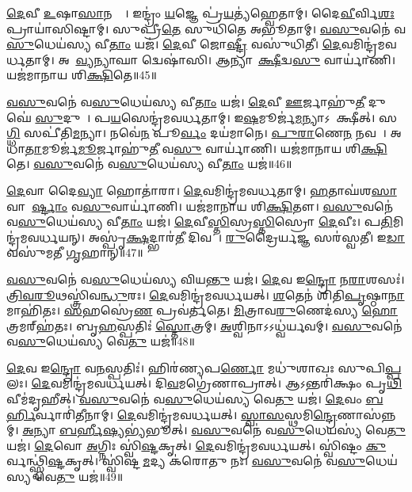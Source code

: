 \ul{𑌦𑍇}𑌵𑍀 \ul{𑌉}𑌷𑌾\ul{𑌸𑌾}𑌨𑌕𑍍𑌤𑌾᳚।
𑌇𑌨𑍍𑌦𑍍𑌰𑌂॑ \ul{𑌯}𑌜𑍍𑌞𑍇 𑌪𑍍𑌰॑\ul{𑌯}𑌤𑍍𑌯॑𑌹𑍍𑌵𑍇𑌤𑌾𑌮𑍍।
𑌦𑍈\ul{𑌵𑍀}𑌰𑍍𑌵𑌿\ul{𑌶𑌃} 𑌪𑍍𑌰𑌾𑌯𑌾॑𑌸𑌿𑌷𑍍𑌟𑌾𑌮𑍍।
𑌸𑍁𑌪𑍍𑌰𑍀॑\ul{𑌤𑍇} 𑌸𑍁𑌧𑌿॑𑌤𑍇 𑌅𑌭𑍂𑌤𑌾𑌮𑍍।
\ul{𑌵}\ul{𑌸𑍁}𑌵𑌨𑍇॑ 𑌵\ul{𑌸𑍁}𑌧𑍇𑌯॑𑌸𑍍𑌯 𑌵𑍀\ul{𑌤𑌾𑌂} 𑌯𑌜॑।
\ul{𑌦𑍇}𑌵𑍀 𑌜𑍋\ul{𑌷𑍍𑌟𑍍𑌰𑍀} 𑌵𑌸𑍁॑𑌧𑌿𑌤𑍀।
\ul{𑌦𑍇}𑌵𑌮𑌿𑌨𑍍𑌦𑍍𑌰॑𑌮𑌵𑌰𑍍𑌧𑌤𑌾𑌮𑍍।
𑌅𑌯𑌾᳚\ul{𑌵𑍍𑌯}𑌨𑍍𑌯𑌾𑌘𑌾 𑌦𑍍𑌵𑍇𑌷𑌾॑𑌸𑌿।
𑌆𑌨𑍍𑌯𑌾𑌵𑌾᳚\ul{𑌕𑍍𑌷𑍀}𑌦𑍍𑌵\ul{𑌸𑍁} 𑌵𑌾𑌰𑍍𑌯𑌾॑𑌣𑌿।
𑌯𑌜॑𑌮𑌾𑌨𑌾𑌯 𑌶𑌿\ul{𑌕𑍍𑌷𑌿}𑌤𑍇॥45॥

\ul{𑌵}\ul{𑌸𑍁}𑌵𑌨𑍇॑ 𑌵\ul{𑌸𑍁}𑌧𑍇𑌯॑𑌸𑍍𑌯 𑌵𑍀\ul{𑌤𑌾𑌂} 𑌯𑌜॑।
\ul{𑌦𑍇}𑌵𑍀 \ul{𑌊}𑌰𑍍𑌜𑌾𑌹𑍁॑\ul{𑌤𑍀} 𑌦𑍁𑌘𑍇॑ \ul{𑌸𑍁}𑌦𑍁𑌘𑍇᳚।
𑌪\ul{𑌯}𑌸𑍇𑌨𑍍𑌦𑍍𑌰॑𑌮𑌵𑌰𑍍𑌧𑌤𑌾𑌮𑍍।
𑌇\ul{𑌷}𑌮𑍂𑌰𑍍𑌜॑\ul{𑌮}𑌨𑍍𑌯𑌾\-𑌽𑌵𑌾᳚𑌕𑍍𑌷𑍀𑌤𑍍।
𑌸\ul{𑌗𑍍𑌧𑌿}\ul{} 𑌸𑌪𑍀॑𑌤𑌿\ul{𑌮}𑌨𑍍𑌯𑌾।
𑌨𑌵𑍇॑\ul{𑌨} 𑌪𑍂\ul{𑌰𑍍𑌵𑌂} 𑌦𑌯॑𑌮𑌾𑌨𑍇।
\ul{𑌪𑍁}\ul{𑌰𑌾}𑌣𑍇\ul{𑌨} 𑌨𑌵𑌮𑍍᳚।
𑌅𑌧𑌾॑\ul{𑌤𑌾}𑌮𑍂𑌰𑍍𑌜॑\ul{𑌮𑍂}𑌰𑍍𑌜𑌾𑌹𑍁॑\ul{𑌤𑍀} 𑌵\ul{𑌸𑍁} 𑌵𑌾𑌰𑍍𑌯𑌾॑𑌣𑌿।
𑌯𑌜॑𑌮𑌾𑌨𑌾𑌯 𑌶𑌿\ul{𑌕𑍍𑌷𑌿}𑌤𑍇।
\ul{𑌵}\ul{𑌸𑍁}𑌵𑌨𑍇॑ 𑌵\ul{𑌸𑍁}𑌧𑍇𑌯॑𑌸𑍍𑌯 𑌵𑍀\ul{𑌤𑌾𑌂} 𑌯𑌜॑॥46॥

\ul{𑌦𑍇}𑌵𑌾 𑌦𑍈\ul{𑌵𑍍𑌯𑌾} 𑌹𑍋𑌤𑌾॑𑌰𑌾।
\ul{𑌦𑍇}𑌵𑌮𑌿𑌨𑍍𑌦𑍍𑌰॑𑌮𑌵𑌰𑍍𑌧𑌤𑌾𑌮𑍍।
\ul{𑌹}𑌤𑌾𑌘॑𑌶\ul{𑌸𑌾}𑌵𑌾\-𑌭𑌾᳚\ul{𑌰𑍍𑌷𑍍𑌟𑌾𑌂} 𑌵\ul{𑌸𑍁}𑌵𑌾𑌰𑍍𑌯𑌾॑𑌣𑌿।
𑌯𑌜॑𑌮𑌾𑌨𑌾𑌯 𑌶𑌿\ul{𑌕𑍍𑌷𑌿}𑌤𑍗।
\ul{𑌵}\ul{𑌸𑍁}𑌵𑌨𑍇॑ 𑌵\ul{𑌸𑍁}𑌧𑍇𑌯॑𑌸𑍍𑌯 𑌵𑍀\ul{𑌤𑌾𑌂} 𑌯𑌜॑।
\ul{𑌦𑍇}𑌵𑍀\ul{𑌸𑍍𑌤𑌿}𑌸𑍍𑌰\ul{𑌸𑍍𑌤𑌿}𑌸𑍍𑌰𑍋 \ul{𑌦𑍇}𑌵𑍀𑌃।
𑌪\ul{𑌤𑌿}𑌮𑌿𑌨𑍍𑌦𑍍𑌰॑𑌮𑌵𑌰𑍍𑌧𑌯𑌨𑍍।
𑌅𑌸𑍍𑌪𑍃॑\ul{𑌕𑍍𑌷}𑌦𑍍𑌭𑌾𑌰॑\ul{𑌤𑍀} 𑌦𑌿𑌵𑌮𑍍᳚।
\ul{𑌰𑍁}𑌦𑍍𑌰𑍈𑌰𑍍\mbox{}\ul{𑌯}𑌜𑍍𑌞 𑌸𑌰॑𑌸𑍍𑌵𑌤𑍀।
𑌇\ul{𑌡𑌾} 𑌵𑌸𑍁॑𑌮𑌤𑍀 \ul{𑌗𑍃}𑌹𑌾𑌨𑍍॥47॥

\ul{𑌵}\ul{𑌸𑍁}𑌵𑌨𑍇॑ 𑌵\ul{𑌸𑍁}𑌧𑍇𑌯॑𑌸𑍍𑌯 𑌵𑌿𑌯\ul{𑌨𑍍𑌤𑍁} 𑌯𑌜॑।
\ul{𑌦𑍇}𑌵 𑌇\ul{𑌨𑍍𑌦𑍍𑌰𑍋} 𑌨\ul{𑌰𑌾}𑌶𑌸𑌃॑।
\ul{𑌤𑍍𑌰𑌿}\ul{𑌵}\ul{𑌰𑍂}𑌥𑌸𑍍𑌤𑍍𑌰𑌿॑𑌵\ul{𑌨𑍍𑌧𑍁}𑌰𑌃।
\ul{𑌦𑍇}𑌵𑌮𑌿𑌨𑍍𑌦𑍍𑌰॑𑌮𑌵𑌰𑍍𑌧𑌯𑌤𑍍।
\ul{𑌶}𑌤𑍇𑌨॑ 𑌶𑌿𑌤𑌿\-\ul{𑌪𑍃}𑌷𑍍𑌠𑌾\ul{𑌨𑌾}𑌮𑌾𑌹𑌿॑𑌤𑌃।
\ul{𑌸}𑌹𑌸𑍍𑌰𑍇॑\ul{𑌣} 𑌪𑍍𑌰𑌵॑𑌰𑍍𑌤𑌤𑍇।
\ul{𑌮𑌿}𑌤𑍍𑌰𑌾𑌵\ul{𑌰𑍁}𑌣𑍇𑌦॑𑌸𑍍𑌯 \ul{𑌹𑍋}𑌤𑍍𑌰𑌮𑌰𑍍‌\mbox{}𑌹॑𑌤𑌃।
𑌬𑍃\ul{𑌹}𑌸𑍍𑌪𑌤𑌿𑌃॑ \ul{𑌸𑍍𑌤𑍋}𑌤𑍍𑌰𑌮𑍍।
\ul{𑌅}𑌶𑍍𑌵𑌿𑌨𑌾\-𑌽𑌽𑌧𑍍𑌵॑𑌰𑍍𑌯𑌵𑌮𑍍।
\ul{𑌵}\ul{𑌸𑍁}𑌵𑌨𑍇॑ 𑌵\ul{𑌸𑍁}𑌧𑍇𑌯॑𑌸𑍍𑌯 𑌵𑍇\ul{𑌤𑍁} 𑌯𑌜॑॥48॥

\ul{𑌦𑍇}𑌵 𑌇\ul{𑌨𑍍𑌦𑍍𑌰𑍋} 𑌵\ul{𑌨}𑌸𑍍𑌪𑌤𑌿𑌃॑।
𑌹𑌿𑌰॑𑌣𑍍𑌯𑌪\ul{𑌰𑍍𑌣𑍋} 𑌮𑌧𑍁॑𑌶𑌾𑌖𑌃 𑌸𑍁𑌪𑌿\ul{𑌪𑍍𑌪}𑌲𑌃।
\ul{𑌦𑍇}𑌵𑌮𑌿𑌨𑍍𑌦𑍍𑌰॑𑌮𑌵𑌰𑍍𑌧𑌯𑌤𑍍।
𑌦𑌿\ul{𑌵}𑌮𑌗𑍍𑌰𑍇॑𑌣𑌾𑌪𑍍𑌰𑌾𑌤𑍍।
𑌆𑌽𑌨𑍍𑌤𑌰𑌿॑𑌕𑍍𑌷𑌂 𑌪𑍃\ul{𑌥𑌿}𑌵𑍀𑌮॑𑌦𑍃𑌹𑍀𑌤𑍍।
\ul{𑌵}\ul{𑌸𑍁}𑌵𑌨𑍇॑ 𑌵\ul{𑌸𑍁}𑌧𑍇𑌯॑𑌸𑍍𑌯 𑌵𑍇\ul{𑌤𑍁} 𑌯𑌜॑।
\ul{𑌦𑍇}𑌵𑌂 \ul{𑌬}\ul{𑌰𑍍}𑌹𑌿𑌰𑍍𑌵𑌾𑌰𑌿॑𑌤𑍀𑌨𑌾𑌮𑍍।
\ul{𑌦𑍇}𑌵𑌮𑌿𑌨𑍍𑌦𑍍𑌰॑𑌮𑌵𑌰𑍍𑌧𑌯𑌤𑍍।
\ul{𑌸𑍍𑌵𑌾}\ul{𑌸}𑌸𑍍𑌥𑌮𑌿\ul{𑌨𑍍𑌦𑍍𑌰𑍇}𑌣𑌾\-𑌸॑𑌨𑍍𑌨𑌮𑍍।
\ul{𑌅}𑌨𑍍𑌯𑌾 \ul{𑌬}\ul{𑌰𑍍}𑌹𑍀\ul{𑌷𑍍𑌯}𑌭𑍍𑌯॑𑌭𑍂𑌤𑍍।
\ul{𑌵}\ul{𑌸𑍁}𑌵𑌨𑍇॑ 𑌵\ul{𑌸𑍁}𑌧𑍇𑌯𑌸𑍍𑌯॑ 𑌵𑍇\ul{𑌤𑍁} 𑌯𑌜॑।
\ul{𑌦𑍇}𑌵𑍋 \ul{𑌅}𑌗𑍍𑌨𑌿𑌃 𑌸𑍍𑌵𑌿॑\ul{𑌷𑍍𑌟}\-𑌕𑍃𑌤𑍍।
\ul{𑌦𑍇}𑌵𑌮𑌿𑌨𑍍𑌦𑍍𑌰॑𑌮𑌵𑌰𑍍𑌧𑌯𑌤𑍍।
𑌸𑍍𑌵𑌿॑𑌷𑍍𑌟𑌂 \ul{𑌕𑍁}𑌰𑍍𑌵𑌨𑍍𑌥𑍍𑌸𑍍𑌵𑌿॑\ul{𑌷𑍍𑌟}\-𑌕𑍃𑌤𑍍।
𑌸𑍍𑌵𑌿॑𑌷𑍍𑌟\ul{𑌮}𑌦𑍍𑌯 𑌕॑𑌰𑍋𑌤𑍁 𑌨𑌃।
\ul{𑌵}\ul{𑌸𑍁}𑌵𑌨𑍇॑ 𑌵\ul{𑌸𑍁}𑌧𑍇𑌯॑𑌸𑍍𑌯 𑌵𑍇\ul{𑌤𑍁} 𑌯𑌜॑॥49॥

